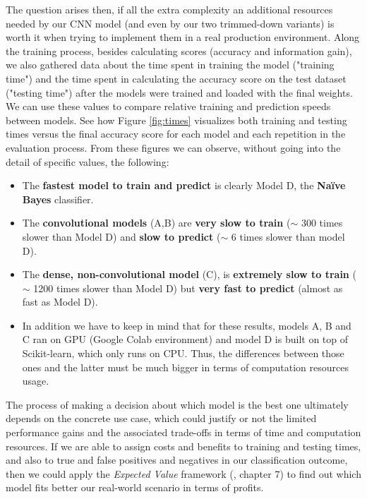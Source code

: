 \documentclass[10pt,journal,compsoc, onecolumn]{IEEEtran}
\begin{document}
The question arises then, if all the extra complexity an additional resources needed by our CNN model (and even by our two trimmed-down variants) is worth it when trying to implement them in a real production environment. Along the training process, besides calculating scores (accuracy and information gain), we also gathered data about the time spent in training the model ("training time") and the time spent in calculating the accuracy score on the test dataset ("testing time") after the models were trained and loaded with the final weights. We can use these values to compare relative training and prediction speeds between models. See how Figure \ref{fig:times} visualizes both training and testing times versus the final accuracy score for each model and each repetition in the evaluation process. From these figures we can observe, without going into the detail of specific values, the following: 
\begin{itemize}
    \item The \textbf{fastest model to train and predict} is clearly Model D, the \textbf{Naïve Bayes} classifier.
    \item The \textbf{convolutional models} (A,B) are \textbf{very slow to train} ($\sim$ 300 times slower than Model D) and \textbf{slow to predict} ($\sim$ 6 times slower than model D).
    \item The \textbf{dense, non-convolutional model} (C), is \textbf{extremely slow to train }($\sim$ 1200 times slower than Model D) but \textbf{very fast to predict} (almost as fast as Model D).
    \item In addition we have to keep in mind that for these results, models A, B and C ran on GPU (Google Colab environment) and model D is built on top of Scikit-learn, which only runs on CPU. Thus, the differences between those ones and the latter must be much bigger in terms of computation resources usage.
\end{itemize}

The process of making a decision about which model is the best one ultimately depends on the concrete use case, which could justify or not the limited performance gains and the associated trade-offs in terms of time and computation resources. If we are able to assign costs and benefits to training and testing times, and also to true and false positives and negatives in our classification outcome, then we could apply the \textit{Expected Value} framework (\cite{Provost}, chapter 7) to find out which model fits better our real-world scenario in terms of profits.
\end{document}

